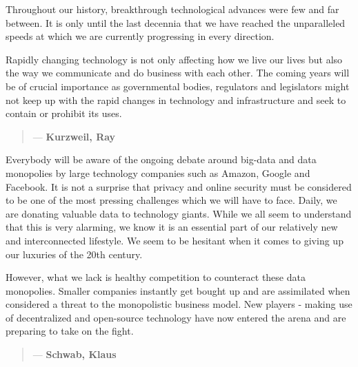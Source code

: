     Throughout our history, breakthrough technological advances were few and far between. It is only until the last decennia that we have reached the unparalleled speeds at which we are currently progressing in every direction.
    
    Rapidly changing technology is not only affecting how we live our lives but also the way we communicate and do business with each other. The coming years will be of crucial importance as governmental bodies, regulators and legislators might not keep up with the rapid changes in technology and infrastructure and seek to contain or prohibit its uses. 
   
    
    \begin{quotation}

      \textit{}
      \begin{flushright}
        \small{--- \textbf{Kurzweil, Ray}}
      \end{flushright}
    
    \end{quotation}
    
    Everybody will be aware of the ongoing debate around big-data and data monopolies by large technology companies such as Amazon, Google and Facebook. It is not a surprise that privacy and online security must be considered to be one of the most pressing challenges which we will have to face. Daily, we are donating valuable data to technology giants. While we all seem to understand that this is very alarming, we know it is an essential part of our relatively new and interconnected lifestyle. We seem to be hesitant when it comes to giving up our luxuries of the 20th century. 
    
    However, what we lack is healthy competition to counteract these data monopolies. Smaller companies instantly get bought up and are assimilated when considered a threat to the monopolistic business model. New players - making use of decentralized and open-source technology have now entered the arena and are preparing to take on the fight.
    
    \begin{quotation}

  \textit{}
  \begin{flushright}
    \small{--- \textbf{Schwab, Klaus}}
  \end{flushright}

\end{quotation}
    

